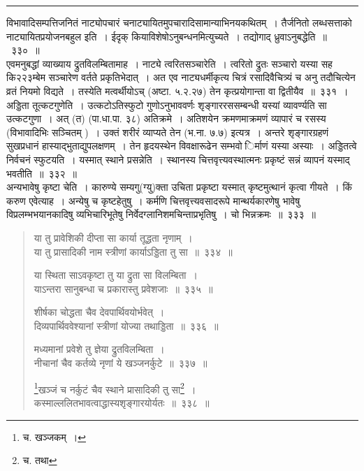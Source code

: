 \documentclass[11pt, openany]{book}
\begin{document}
\hrule

\vspace{2mm}
\noindent
विभावादिसम्पत्तिजनितं {\qtt नाट्योपचारं} चनाट्यायितमुपचारादिसामान्याभिनयकथितम्~। {\qtt तैर्जनितो} लब्धसत्ताको नाट्यायितप्रयोजनबहुल इति~। ईदृक् कियाविशेषोऽनुबन्धनमित्युच्यते~। तद्योगाद् ध्रुवाऽनुबद्धेति~॥~३३०~॥\\

एवमनुबद्धां व्याख्याय {\qtt द्रुतविलम्बितामाह~। नाट्ये त्वरितसञ्चारेति}~। त्वरितो द्रुतः सञ्चारो यस्या सह कि२२३म्बेम सञ्चारेण वर्तते प्रकृतिभेदात्~। अत एव नाट्यधर्मीकृत्य चित्रं रसादिवैचित्र्यं च अनु तदौचित्येन व्रतं नियमो विद्यते~। तस्येति मत्वर्थीयोऽच् (अष्टा. ५.२.२७) तेन कृत्प्रयोगान्ता वा द्वितीयैव~॥~३३१~।\\ 

{\qtt अड्डिता तूत्कटगुणेति}~। उत्कटोऽतिस्फुटो गुणोऽनुभाववर्णः शृङ्गाररससम्बन्धी यस्यां व्यावर्ण्यति सा उत्कटगुणा~। अत् (त) (पा.धा.पा. ३८) अतिक्रमे~। अतिशयेन क्रमणमाक्रमणं व्यापारं च रसस्य (विभावादिभिः सञ्चितम् )~। उक्तं शरीरं व्याप्यते तेन (भ.ना. ७.७) इत्यत्र~। अन्तरे शृङ्गारग्रहणं सुखप्रधानं हास्याद्भुताद्युपलक्षणम्~। तेन हृदयस्थेन विवक्षारूढेन सम्भवो िर्माणं यस्या अस्याः~। अड्डितत्वे निर्वचनं स्फुटयति~। {\qtt यस्मात् स्थाने प्रसन्नेति}~। स्थानस्य चित्तवृत्त्यवस्थात्मनः प्रकृष्टं सन्नं व्यापनं यस्माद् भवतीति~॥~३३२~॥\\

{\qtt अन्यभावेषु कृष्टा} चेति~। {\qtt कारुण्ये} सम्यगु(ग्यु)क्ता उचिता प्रकृष्टा यस्मात् कृष्टमुत्थानं कृत्वा गीयते~। किं करुण एवेत्याह~। अन्येषु च {\qtt कृष्टहेतुषु}~। कर्मणि चित्तवृत्त्यवसादरूपे मान्थर्यकारणेषु भावेषु विप्रलम्भभयानकादिषु व्यभिचारिभूतेषु निर्वेदग्लानिशमचिन्ताप्रभृतिषु~। चो भिन्नक्रमः~॥~३३३~॥ 

\newpage

\begin{quote}
{\na या तु प्रावेशिकी दीप्ता सा कार्या तूद्धता नृणाम्~। \\
 या तु प्रासादिकी नाम स्त्रीणां कार्याऽड्डिता तु सा~॥~३३४~॥

 या स्थिता साऽवकृष्टा तु या द्रुता सा विलम्बिता~।\\
 याऽन्तरा सानुबन्धा च प्रकारास्तु प्रवेशजाः~॥~३३५~॥

 शीर्षका चोद्धता चैव देवपार्थिवयोर्भवेत्~।\\
 दिव्यपार्थिववेश्यानां स्त्रीणां योज्या तथाड्डिता~॥~३३६~॥

 मध्यमानां प्रवेशे तु ज्ञेया द्रुतविलम्बिता~। \\
 नीचानां चैव कर्तव्ये नृणां ये खञ्जनर्कुटे~॥~३३७~॥ 

 \renewcommand{\thefootnote}{1}\footnote{च. खञ्जकम्~।}खञ्जं च नर्कुटं चैव स्थाने प्रासादिकी तु सा\renewcommand{\thefootnote}{2}\footnote{च. तथा }~। \\
 कस्माल्ललितभावत्वाद्धास्यशृङ्गारयोर्यतः~॥~३३८~॥}
\end{quote}
\end{document}
